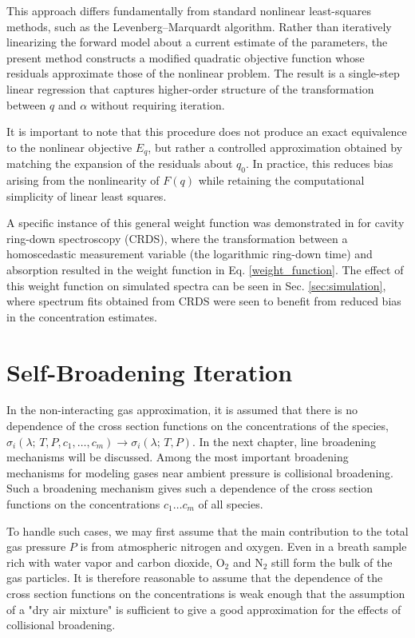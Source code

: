 \documentclass[8pt,a4paper]{report}
\begin{document}
	
	This approach differs fundamentally from standard nonlinear least-squares methods, such as the Levenberg--Marquardt algorithm. Rather than iteratively linearizing the forward model about a current estimate of the parameters, the present method constructs a modified quadratic objective function whose residuals approximate those of the nonlinear problem. The result is a single-step linear regression that captures higher-order structure of the transformation between $q$ and $\alpha$ without requiring iteration.
	
	It is important to note that this procedure does not produce an exact equivalence to the nonlinear objective $E_q$, but rather a controlled approximation obtained by matching the expansion of the residuals about $q_0$. In practice, this reduces bias arising from the nonlinearity of $F(q)$ while retaining the computational simplicity of linear least squares.
	
	A specific instance of this general weight function was demonstrated in \cite{mine_acetone} for cavity ring-down spectroscopy (CRDS), where the transformation between a homoscedastic measurement variable (the logarithmic ring-down time) and absorption resulted in the weight function in Eq. \ref{weight_function}. The effect of this weight function on simulated spectra can be seen in Sec. \ref{sec:simulation}, where spectrum fits obtained from CRDS were seen to benefit from reduced bias in the concentration estimates.
	
	\section{Self-Broadening Iteration} \label{sec:self_broading_iteration}
	In the non-interacting gas approximation, it is assumed that there is no dependence of the cross section functions on the concentrations of the species, $\sigma_i(\lambda ;\,T, P, c_1, \ldots, c_m) \rightarrow \sigma_i(\lambda ;\,T, P)$. In the next chapter, line broadening mechanisms will be discussed. Among the most important broadening mechanisms for modeling gases near ambient pressure is collisional broadening. Such a broadening mechanism gives such a dependence of the cross section functions on the concentrations $c_1 \ldots c_m$ of all species.
	
	To handle such cases, we may first assume that the main contribution to the total gas pressure $P$ is from atmospheric nitrogen and oxygen. Even in a breath sample rich with water vapor and carbon dioxide, O$_2$ and N$_2$ still form the bulk of the gas particles. It is therefore reasonable to assume that the dependence of the cross section functions on the concentrations is weak enough that the assumption of a "dry air mixture" is sufficient to give a good approximation for the effects of collisional broadening.
	
\end{document}
